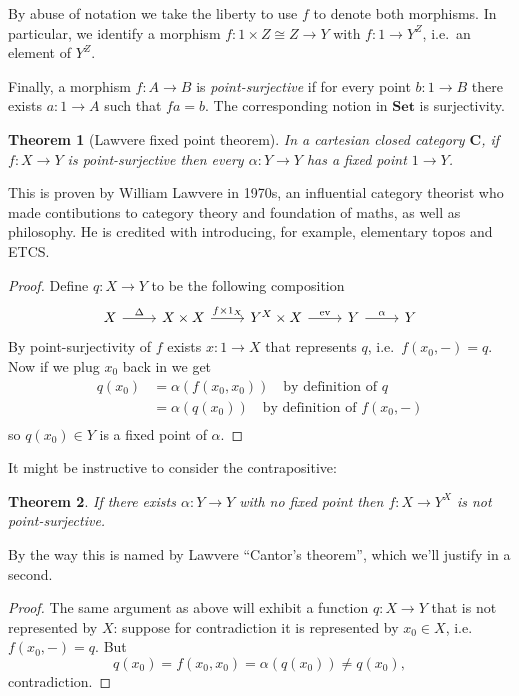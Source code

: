 \documentclass[a4paper]{article}
\newtheorem{theorem}{Theorem}
\renewcommand{\c}[1]{\mathbf{#1}}
\newcommand{\Set}{{\c{Set}}}
\begin{document}
By abuse of notation we take the liberty to use \(f\) to denote both morphisms. In particular, we identify a morphism \(f: 1 \times Z \cong Z \to Y\) with \(f: 1 \to Y^Z\), i.e.\ an element of \(Y^Z\).

Finally, a morphism \(f: A \to B\) is \emph{point-surjective} if for every point \(b: 1 \to B\) there exists \(a: 1 \to A\) such that \(fa = b\). The corresponding notion in \(\Set\) is surjectivity.

\begin{theorem}[Lawvere fixed point theorem]
  In a cartesian closed category \(\c C\), if \(f: X \to Y\) is point-surjective then every \(\alpha: Y \to Y\) has a fixed point \(1 \to Y\).
\end{theorem}

This is proven by William Lawvere in 1970s, an influential category theorist who made contibutions to category theory and foundation of maths, as well as philosophy. He is credited with introducing, for example, elementary topos and ETCS.

\begin{proof}
  Define \(q: X \to Y\) to be the following composition
  \[
    \begin{tikzcd}
      X \ar[r, "\Delta"] & X \times X \ar[r, "f \times 1_X"] & Y^X \times X \ar[r, "\operatorname{ev}"] & Y \ar[r, "\alpha"] & Y
    \end{tikzcd}
  \]
  By point-surjectivity of \(f\) exists \(x: 1 \to X\) that represents \(q\), i.e.\ \(f(x_0, -) = q\). Now if we plug \(x_0\) back in we get
  \begin{align*}
    q(x_0)
    &= \alpha(f(x_0, x_0)) \quad \text{by definition of } q \\
    &= \alpha(q(x_0)) \quad \text{by definition of } f(x_0, -) \\
  \end{align*}
  so \(q(x_0) \in Y\) is a fixed point of \(\alpha\).
\end{proof}

It might be instructive to consider the contrapositive:

\begin{theorem}
  If there exists \(\alpha: Y \to Y\) with no fixed point then \(f: X \to Y^X\) is not point-surjective.
\end{theorem}

By the way this is named by Lawvere ``Cantor's theorem'', which we'll justify in a second.

\begin{proof}
  The same argument as above will exhibit a function \(q: X \to Y\) that is not represented by \(X\): suppose for contradiction it is represented by \(x_0 \in X\), i.e.\ \(f(x_0, -) = q\). But
  \[
    q(x_0) = f(x_0, x_0) = \alpha(q(x_0)) \neq q(x_0),
  \]
  contradiction.
\end{proof}
\end{document}
